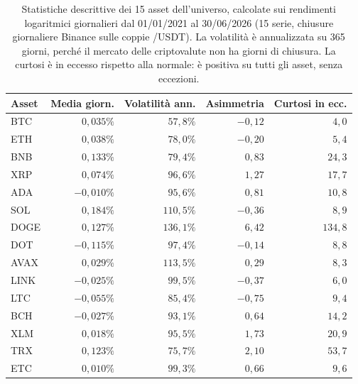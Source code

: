 \begin{table}[H]
\centering
\caption[Statistiche descrittive dell'universo]{Statistiche descrittive dei 15 asset dell'universo, calcolate sui rendimenti logaritmici giornalieri dal 01/01/2021 al 30/06/2026 (15 serie, chiusure giornaliere Binance sulle coppie /USDT). La volatilità è annualizzata su 365 giorni, perché il mercato delle criptovalute non ha giorni di chiusura. La curtosi è in eccesso rispetto alla normale: è positiva su tutti gli asset, senza eccezioni.}
\label{tab:universe}
\small
\begin{tabular}{@{}lrrrr@{}}
\toprule
\textbf{Asset} & \textbf{Media giorn.} & \textbf{Volatilità ann.} & \textbf{Asimmetria} & \textbf{Curtosi in ecc.} \\
\midrule
BTC & $0{,}035\%$ & $57{,}8\%$ & $-0{,}12$ & $4{,}0$ \\
ETH & $0{,}038\%$ & $78{,}0\%$ & $-0{,}20$ & $5{,}4$ \\
BNB & $0{,}133\%$ & $79{,}4\%$ & $0{,}83$ & $24{,}3$ \\
XRP & $0{,}074\%$ & $96{,}6\%$ & $1{,}27$ & $17{,}7$ \\
ADA & $-0{,}010\%$ & $95{,}6\%$ & $0{,}81$ & $10{,}8$ \\
SOL & $0{,}184\%$ & $110{,}5\%$ & $-0{,}36$ & $8{,}9$ \\
DOGE & $0{,}127\%$ & $136{,}1\%$ & $6{,}42$ & $134{,}8$ \\
DOT & $-0{,}115\%$ & $97{,}4\%$ & $-0{,}14$ & $8{,}8$ \\
AVAX & $0{,}029\%$ & $113{,}5\%$ & $0{,}29$ & $8{,}3$ \\
LINK & $-0{,}025\%$ & $99{,}5\%$ & $-0{,}37$ & $6{,}0$ \\
LTC & $-0{,}055\%$ & $85{,}4\%$ & $-0{,}75$ & $9{,}4$ \\
BCH & $-0{,}027\%$ & $93{,}1\%$ & $0{,}64$ & $14{,}2$ \\
XLM & $0{,}018\%$ & $95{,}5\%$ & $1{,}73$ & $20{,}9$ \\
TRX & $0{,}123\%$ & $75{,}7\%$ & $2{,}10$ & $53{,}7$ \\
ETC & $0{,}010\%$ & $99{,}3\%$ & $0{,}66$ & $9{,}6$ \\
\bottomrule
\end{tabular}
\end{table}
